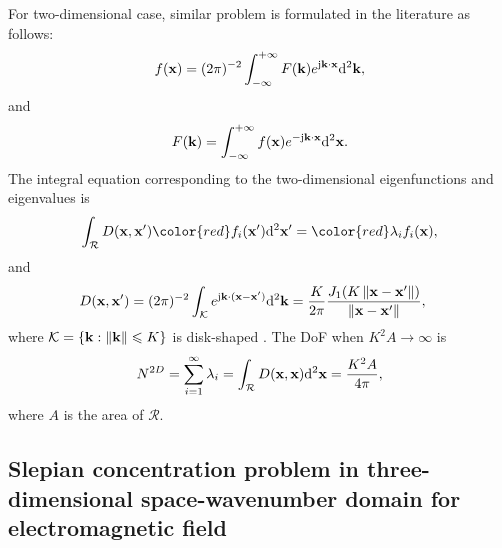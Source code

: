 \documentclass[12pt,draftclsnofoot,journal,onecolumn]{IEEEtran}
\begin{document}
	For two-dimensional case, similar problem is formulated in the literature as follows:
	\begin{equation}
		\begin{aligned}
			f({\bf x})=(2\pi)^{-2}\int_{-\infty}^{+\infty}F({\bf k})e^{{\rm j}{\bf k}\cdot {\bf x}}{\rm d}^2{\bf k},
		\end{aligned}
		\label{eq_2d_fourier}
	\end{equation}
	and
	\begin{equation}
		\begin{aligned}
			F({\bf k}) = \int_{-\infty}^{+\infty}f({\bf x})e^{-{\rm j}{\bf k}\cdot {\bf x}}{\rm d}^2{\bf x}.
		\end{aligned}
	\end{equation}
	The integral equation corresponding to the two-dimensional eigenfunctions and eigenvalues is 
	\begin{equation}
		\begin{aligned}
			\int_{\mathcal{R}}D({\bf x},{\bf x}'){\color{red}f_i({\bf x}')}{\rm d}^2{\bf x}' = {\color{red}\lambda_i f_i({\bf x})},
		\end{aligned}
		\label{eqn_2d_integral}
	\end{equation}
	and
	\begin{equation}
		\begin{aligned}
			D({\bf x},{\bf x}') &= (2\pi)^{-2}\int_{\mathcal{K}} e^{{\rm j}{\bf k}\cdot({\bf x}-{\bf x}')}{\rm d}^2{\bf k} = \frac{K}{2\pi} \frac{J_1(K\left\| {\bf x}-{\bf x}' \right\|)}{\left\| {\bf x}-{\bf x}' \right\|},
		\end{aligned}
	\end{equation}
	where $\mathcal{K} = \{{\bf k} : \left\| {\bf k} \right\|\leqslant K\}$ is disk-shaped \cite{beylkin2007grids}. 
	The DoF when $K^2A \rightarrow \infty$ is 
	\begin{equation}
		\begin{aligned}
			N^{2D} = \sum_{i=1}^\infty \lambda_i = \int_{\mathcal{R}}D({\bf x},{\bf x}){\rm d}^2{\bf x} = \frac{K^2A}{4\pi},
		\end{aligned}
		\label{eq_2d_dof}
	\end{equation}
	where $A$ is the area of $\mathcal{R}$. 
	
	\subsection{Slepian concentration problem in three-dimensional space-wavenumber domain for electromagnetic field}
	\label{subsec_3d_slepian}
	
\end{document}
